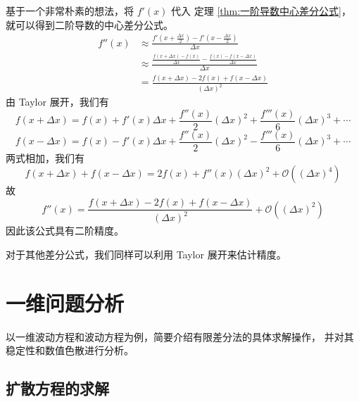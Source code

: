 \begin{solution}
    基于一个非常朴素的想法，将 $f'(x)$ 代入 
    定理 \ref{thm:一阶导数中心差分公式}，就可以得到二阶导数的中心差分公式。
    \begin{align*}
        f''(x)&\approx\frac{f'(x+\frac{\Delta x}{2})-f'(x-\frac{\Delta x}{2})}{\Delta x}\\
        &\approx\frac{\frac{f(x+\Delta x)-f(x)}{\Delta x}
            -\frac{f(x)-f(x-\Delta x)}{\Delta x}}{\Delta x}\\
        &=\frac{f(x+\Delta x)-2f(x)+f(x-\Delta x)}{(\Delta x)^2}
    \end{align*}
    由 Taylor 展开，我们有
    \begin{equation*}
        f(x+\Delta x)=f(x)+f'(x)\Delta x+\frac{f''(x)}{2}(\Delta x)^2
            +\frac{f'''(x)}{6}(\Delta x)^3+\cdots
    \end{equation*}
    \begin{equation*}
        f(x-\Delta x)=f(x)-f'(x)\Delta x+\frac{f''(x)}{2}(\Delta x)^2
            -\frac{f'''(x)}{6}(\Delta x)^3+\cdots
    \end{equation*}
    两式相加，我们有
    \begin{equation*}
        f(x+\Delta x)+f(x-\Delta x)=2f(x)+f''(x)(\Delta x)^2 
        +\mathcal{O}((\Delta x)^4)
    \end{equation*}
    故
    \begin{equation*}
        f''(x)=\frac{f(x+\Delta x)-2f(x)+f(x-\Delta x)}{(\Delta x)^2}
        +\mathcal{O}((\Delta x)^2)
    \end{equation*}
    因此该公式具有二阶精度。
\end{solution}

\par 对于其他差分公式，我们同样可以利用 Taylor 展开来估计精度。

\section{一维问题分析}

\par 以一维波动方程和波动方程为例，简要介绍有限差分法的具体求解操作，
并对其稳定性和数值色散进行分析。

\subsection{扩散方程的求解}

